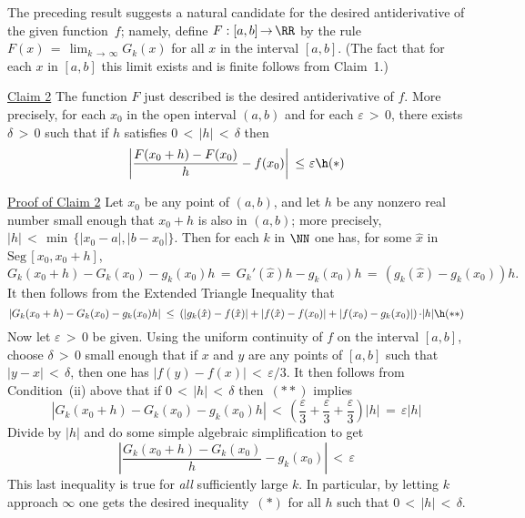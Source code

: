 {        The preceding result suggests a natural candidate for the desired antiderivative of the given function~$f$; namely,
    define $F:[a,b] \,{\rightarrow}\, {\RR}$ by the rule $F(x) \,=\, \lim_{k \,{\rightarrow}\, {\infty}} G_{k}(x)$ for all $x$ in the interval $[a,b]$.
    (The fact that for each $x$ in $[a,b]$ this limit exists and is finite follows from Claim~1.)

\V

    \underline{Claim 2} The function $F$ just described is the desired antiderivative of $f$.
    More precisely, for each $x_{0}$ in the open interval $(a,b)$ and for each ${\varepsilon}\,>\,0$,
    there exists ${\delta}\,>\,0$ such that if $h$ satisfies $0\,<\,|h|\,<\,{\delta}$ then
        \begin{displaymath}
        \left|\frac{F(x_{0} + h) - F(x_{0})}{h} - f(x_{0})\right|\,\,{\leq}\,\,{\varepsilon} \h ({\ast})
        \end{displaymath}

\V

        \underline{Proof of Claim 2} Let $x_{0}$ be any point of $(a,b)$, and let $h$ be any nonzero real number small enough that $x_{0}+h$ is also in $(a,b)$; more precisely, $|h|\,<\,{\min}\,\{|x_{0}-a|,|b-x_{0}|\}$.
    Then for each $k$ in ${\NN}$ one has, for some $\hat{x}$ in $\mbox{Seg}\,[x_{0}, x_{0}+h]$,
        \begin{displaymath}
        G_{k}(x_{0}+h) - G_{k}(x_{0}) - g_{k}(x_{0})h \,=\, G_{k}'(\hat{x})h - g_{k}(x_{0})h \,=\, (g_{k}(\hat{x}) - g_{k}(x_{0}))h.
        \end{displaymath}
    It then follows from the Extended Triangle Inequality that
        \begin{displaymath}
        \left|G_{k}(x_{0}+h) - G_{k}(x_{0}) - g_{k}(x_{0})h\right| 
    \,\,{\leq}\,\,\left(\left|g_{k}(\hat{x}) - f(\hat{x})\right| +|f(\hat{x}) - f(x_{0})| + \left|f(x_{0}) - g_{k}(x_{0})\right|\right){\cdot}|h| \h ({\ast}{\ast})
        \end{displaymath}
    Now let ${\varepsilon}\,>\,0$ be given. Using the uniform continuity of $f$ on the interval $[a,b]$, choose ${\delta}\,>\,0$ small enough that if $x$ and $y$ are any points of $[a,b]$ such that 
    $|y-x|\,<\,{\delta}$, then one has $|f(y)-f(x)|\,<\,{\varepsilon}/3$.
    It then follows from Condition~(ii) above that if $0\,<\,|h|\,<\,{\delta}$ then~$({\ast}{\ast})$ implies
        \begin{displaymath}
        \left|G_{k}(x_{0}+h) - G_{k}(x_{0}) - g_{k}(x_{0})h\right| \,<\,\left(\frac{{\varepsilon}}{3} + \frac{{\varepsilon}}{3} + \frac{{\varepsilon}}{3}\right)|h| \,=\, {\varepsilon}|h|
        \end{displaymath}
    Divide by $|h|$ and do some simple algebraic simplification to get
        \begin{displaymath}
        \left|\frac{G_{k}(x_{0}+h) - G_{k}(x_{0})}{h} - g_{k}(x_{0})\right|\,<\,{\varepsilon}
        \end{displaymath}
    This last inequality is true for {\em all} sufficiently large $k$. In particular,
    by letting $k$ approach ${\infty}$ one gets the desired inequality~$({\ast})$ for all $h$ such that $0\,<\,|h|\,<\,{\delta}$.

}
